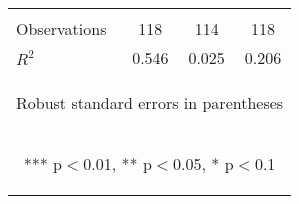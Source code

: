 \begin{center}
\begin{tabular}{lccc}
\vspace{4pt} & \begin{footnotesize}\end{footnotesize} & \begin{footnotesize}\end{footnotesize} & \begin{footnotesize}\end{footnotesize} \\
Observations & 118 & 114 & 118 \\
 $R^2$ & 0.546 & 0.025 & 0.206 \\ \hline
\multicolumn{4}{c}{\begin{footnotesize} Robust standard errors in parentheses\end{footnotesize}} \\
\multicolumn{4}{c}{\begin{footnotesize} *** p$<$0.01, ** p$<$0.05, * p$<$0.1\end{footnotesize}} \\
\end{tabular}
\end{center}
